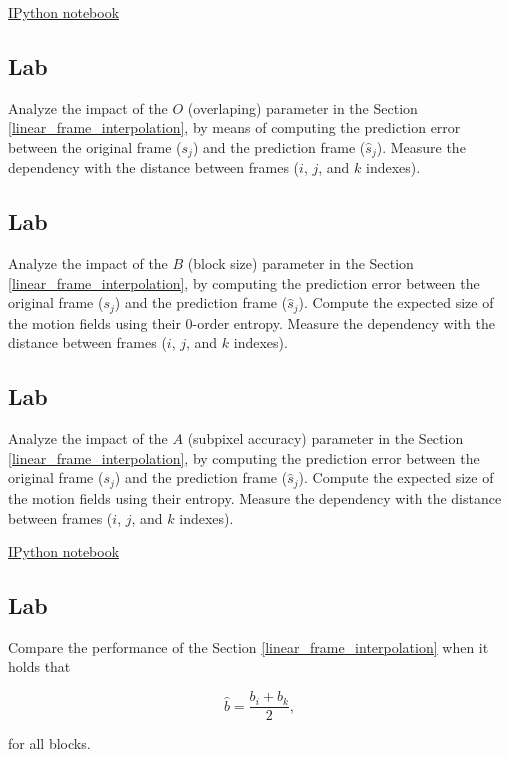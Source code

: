 \href{https://nbviewer.jupyter.org/github/vicente-gonzalez-ruiz/video_coding/blob/master/search_range.ipynb}{IPython notebook}

\subsection{Lab}
Analyze the impact of the \(O\) (overlaping) parameter in the
Section \ref{linear_frame_interpolation}, by means of computing the
prediction error between the original frame (\(s_j\)) and the prediction
frame (\(\hat{s}_j\)). Measure the dependency with the distance between
frames (\(i\), \(j\), and \(k\) indexes).

\subsection{Lab}
Analyze the impact of the \(B\) (block size) parameter in the
Section \ref{linear_frame_interpolation}, by computing the prediction
error between the original frame (\(s_j\)) and the prediction frame
(\(\hat{s}_j\)). Compute the expected size of the motion fields using
their 0-order entropy. Measure the dependency with the distance between
frames (\(i\), \(j\), and \(k\) indexes).

\subsection{Lab}
Analyze the impact of the \(A\) (subpixel accuracy) parameter in the
Section \ref{linear_frame_interpolation}, by computing the prediction
error between the original frame (\(s_j\)) and the prediction frame
(\(\hat{s}_j\)). Compute the expected size of the motion fields using
their entropy. Measure the dependency with the distance between frames
(\(i\), \(j\), and \(k\) indexes).

\href{https://nbviewer.jupyter.org/github/vicente-gonzalez-ruiz/video_coding/blob/master/subpixel_accuracy.ipynb}{IPython notebook}

\subsection{Lab}
Compare the performance of the Section \ref{linear_frame_interpolation}
when it holds that

\begin{equation}
   \hat{b} = \frac{b_i + b_k}{2},
\end{equation}

for all blocks.

